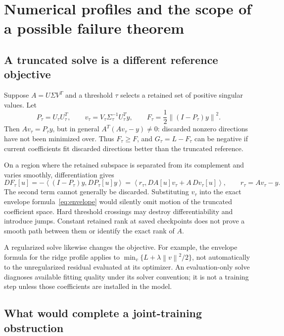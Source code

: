 \documentclass[11pt]{article}
\theoremstyle{remark}
\newcommand{\norm}[1]{\left\lVert #1\right\rVert}
\newcommand{\ip}[2]{\left\langle #1,#2\right\rangle}
\begin{document}
\section{Numerical profiles and the scope of a possible failure theorem}
\subsection{A truncated solve is a different reference objective}

Suppose $A=U\Sigma V^T$ and a threshold $\tau$ selects a retained set of positive singular values. Let
\begin{equation}
 P_\tau=U_\tau U_\tau^T,\qquad
 v_\tau=V_\tau\Sigma_\tau^{-1}U_\tau^Ty,\qquad
 F_\tau=\frac12\norm{(I-P_\tau)y}^2.
\end{equation}
Then $Av_\tau=P_\tau y$, but in general $A^T(Av_\tau-y)\ne0$: discarded nonzero directions have not been minimized over. Thus $F_\tau\geq F$, and $G_\tau=L-F_\tau$ can be negative if current coefficients fit discarded directions better than the truncated reference.

On a region where the retained subspace is separated from its complement and varies smoothly, differentiation gives
\begin{equation}
 DF_\tau[u]
 =-\ip{(I-P_\tau)y}{DP_\tau[u]y}
 =\ip{r_\tau}{DA[u]v_\tau+A\,Dv_\tau[u]},
 \qquad r_\tau=Av_\tau-y.
\end{equation}
The second term cannot generally be discarded. Substituting $v_\tau$ into the exact envelope formula~\eqref{eq:envelope} would silently omit motion of the truncated coefficient space. Hard threshold crossings may destroy differentiability and introduce jumps. Constant retained rank at saved checkpoints does not prove a smooth path between them or identify the exact rank of $A$.

A regularized solve likewise changes the objective. For example, the envelope formula for the ridge profile applies to $\min_v\{L+\lambda\norm{v}^2/2\}$, not automatically to the unregularized residual evaluated at its optimizer. An evaluation-only solve diagnoses available fitting quality under its solver convention; it is not a training step unless those coefficients are installed in the model.

\subsection{What would complete a joint-training obstruction}
\end{document}
